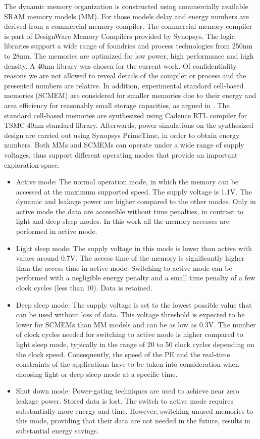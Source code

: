 \documentclass[prodmode,acmtecs]{acmsmall}
\begin{document}
The dynamic memory organization is constructed using commercially available SRAM memory models (MM).
For those models delay and energy numbers are derived from a commercial memory compiler.
The commercial memory compiler is part of DesignWare Memory Compilers provided by Synopsys.
The logic libraries support a wide range of foundries and process technologies from 250nm to 28nm. 
The memories are optimized for low power, high performance and high density. A 40nm library was chosen for the current work.  
Of confidentiality reasons we are not allowed to reveal details of the compiler or process and the presented numbers are relative.
In addition, experimental standard cell-based memories (SCMEM) \cite{Mei11}  are  considered for smaller memories due to their energy and area efficiency for reasonably small storage capacities, as argued in \cite{Mei10}. 
The standard cell-based memories are synthesized using Cadence RTL compiler for TSMC 40nm standard library. 
Afterwards, power simulations on the synthesized design are carried out using Synopsys PrimeTime, in order to obtain energy numbers.
Both MMs and SCMEMs can operate under a wide range of supply voltages, thus support different operating modes that provide an important exploration space.
\begin{itemize}
\item Active mode: The normal operation mode, in which the memory can be accessed at the maximum supported speed. The supply voltage is 1.1V. 
The dynamic and leakage power are higher compared to the other modes.
Only in active mode the data are accessible without time penalties, in contrast to light and deep sleep modes.
In this work all the memory accesses are performed in active mode. 
\item Light sleep mode: The supply voltage in this mode is lower than active with values around 0.7V. 
The access time of the memory is significantly higher than the access time in active mode. 
Switching to active mode can be performed with a negligible energy penalty and a small time penalty of a few clock cycles (less than 10). 
Data is retained.  
\item Deep sleep mode: The supply voltage is set to the lowest possible value that can be used without loss of data. 
This voltage threshold is expected to be lower for SCMEMs than MM models and can be as low as 0.3V. 
The number of clock cycles needed for switching to active mode is higher compared to light sleep mode, typically in the range of 20 to 50 clock cycles depending on the clock speed. 
Consequently, the speed of the PE and the real-time constraints of the applications have to be taken into consideration when choosing light or deep sleep mode at a specific time.  
\item Shut down mode: Power-gating techniques are used to achieve near zero leakage power. 
Stored data is lost. 
The switch to active mode requires substantially more energy and time. 
However, switching unused memories to this mode, providing that their data are not needed in the future, results in substantial energy savings.
\end{itemize}  
\end{document}
